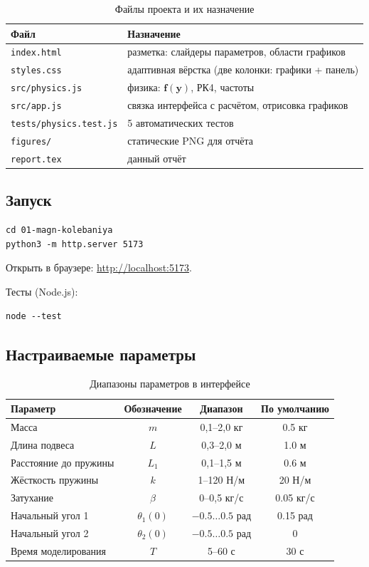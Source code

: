 \documentclass[12pt,a4paper]{article}
\begin{document}
\begin{table}[H]
\centering
\caption{Файлы проекта и их назначение}
\begin{tabular}{@{}ll@{}}
\toprule
Файл & Назначение \\
\midrule
\texttt{index.html} & разметка: слайдеры параметров, области графиков \\
\texttt{styles.css} & адаптивная вёрстка (две колонки: графики + панель) \\
\texttt{src/physics.js} & физика: \(\mathbf{f}(\mathbf{y})\), РК4, частоты \\
\texttt{src/app.js} & связка интерфейса с расчётом, отрисовка графиков \\
\texttt{tests/physics.test.js} & 5 автоматических тестов \\
\texttt{figures/} & статические PNG для отчёта \\
\texttt{report.tex} & данный отчёт \\
\bottomrule
\end{tabular}
\end{table}

\subsection{Запуск}

\begin{lstlisting}
cd 01-magn-kolebaniya
python3 -m http.server 5173
\end{lstlisting}
Открыть в браузере: \url{http://localhost:5173}.

Тесты (Node.js):
\begin{lstlisting}
node --test
\end{lstlisting}

\subsection{Настраиваемые параметры}

\begin{table}[H]
\centering
\caption{Диапазоны параметров в интерфейсе}
\begin{tabular}{@{}lccc@{}}
\toprule
Параметр & Обозначение & Диапазон & По умолчанию \\
\midrule
Масса & \(m\) & 0,1–2,0 кг & 0.5 кг \\
Длина подвеса & \(L\) & 0,3–2,0 м & 1.0 м \\
Расстояние до пружины & \(L_1\) & 0,1–1,5 м & 0.6 м \\
Жёсткость пружины & \(k\) & 1–120 Н/м & 20 Н/м \\
Затухание & \(\beta\) & 0–0,5 кг/с & 0.05 кг/с \\
Начальный угол 1 & \(\theta_1(0)\) & \(-0.5\ldots0.5\) рад & 0.15 рад \\
Начальный угол 2 & \(\theta_2(0)\) & \(-0.5\ldots0.5\) рад & 0 \\
Время моделирования & \(T\) & 5–60 с & 30 с \\
\bottomrule
\end{tabular}
\end{table}
\end{document}
